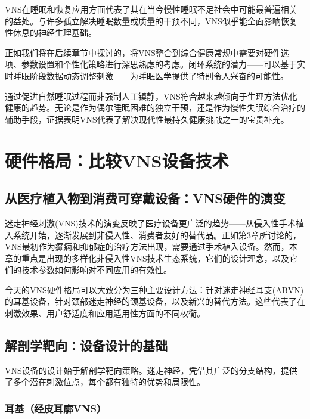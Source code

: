 \documentclass[
  Letterpaper,
]{scrbook}
\begin{document}
VNS在睡眠和恢复应用方面代表了其在当今慢性睡眠不足社会中可能最普遍相关的益处。与许多孤立解决睡眠数量或质量的干预不同，VNS似乎能全面影响恢复性休息的神经生理基础。

正如我们将在后续章节中探讨的，将VNS整合到综合健康常规中需要对硬件选项、参数设置和个性化策略进行深思熟虑的考虑。闭环系统的潜力------可以基于实时睡眠阶段数据动态调整刺激------为睡眠医学提供了特别令人兴奋的可能性。

通过促进自然睡眠过程而非强制人工镇静，VNS符合越来越倾向于生理方法优化健康的趋势。无论是作为偶尔睡眠困难的独立干预，还是作为慢性失眠综合治疗的辅助手段，证据表明VNS代表了解决现代性最持久健康挑战之一的宝贵补充。


\chapter{硬件格局：比较VNS设备技术}\label{ux786cux4ef6ux683cux5c40ux6bd4ux8f83vnsux8bbeux5907ux6280ux672f}

\section{从医疗植入物到消费可穿戴设备：VNS硬件的演变}\label{ux4eceux533bux7597ux690dux5165ux7269ux5230ux6d88ux8d39ux53efux7a7fux6234ux8bbeux5907vnsux786cux4ef6ux7684ux6f14ux53d8}

迷走神经刺激(VNS)技术的演变反映了医疗设备更广泛的趋势------从侵入性手术植入系统开始，逐渐发展到非侵入性、消费者友好的替代品。正如第3章所讨论的，VNS最初作为癫痫和抑郁症的治疗方法出现，需要通过手术植入设备。然而，本章的重点是出现的多样化非侵入性VNS技术生态系统，它们的设计理念，以及它们的技术参数如何影响对不同应用的有效性。

今天的VNS硬件格局可以大致分为三种主要设计方法：针对迷走神经耳支(ABVN)的耳基设备，针对颈部迷走神经的颈基设备，以及新兴的替代方法。这些代表了在刺激效果、用户舒适度和应用适用性方面的不同权衡。

\section{解剖学靶向：设备设计的基础}\label{ux89e3ux5256ux5b66ux9776ux5411ux8bbeux5907ux8bbeux8ba1ux7684ux57faux7840}

VNS设备的设计始于解剖学靶向策略。迷走神经，凭借其广泛的分支结构，提供了多个潜在刺激位点，每个都有独特的优势和局限性。

\subsection{耳基（经皮耳廓VNS）}\label{ux8033ux57faux7ecfux76aeux8033ux5ed3vns}
\end{document}
